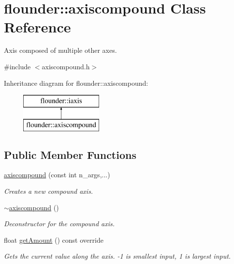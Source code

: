 \hypertarget{classflounder_1_1axiscompound}{}\section{flounder\+:\+:axiscompound Class Reference}
\label{classflounder_1_1axiscompound}


Axis composed of multiple other axes.  




{\ttfamily \#include $<$axiscompound.\+h$>$}

Inheritance diagram for flounder\+:\+:axiscompound\+:\begin{figure}[H]
\begin{center}
\leavevmode
\includegraphics[height=2.000000cm]{classflounder_1_1axiscompound}
\end{center}
\end{figure}
\subsection*{Public Member Functions}
\begin{DoxyCompactItemize}
\item 
\hyperlink{classflounder_1_1axiscompound_a5f1704b50b966bca51730f7fecfc3728}{axiscompound} (const int n\+\_\+args,...)
\begin{DoxyCompactList}\small\item\em Creates a new compound axis. \end{DoxyCompactList}\item 
\hyperlink{classflounder_1_1axiscompound_ae6143bb6a584988c55aaa70545ffae91}{$\sim$axiscompound} ()
\begin{DoxyCompactList}\small\item\em Deconstructor for the compound axis. \end{DoxyCompactList}\item 
float \hyperlink{classflounder_1_1axiscompound_aad0f38f1a532c269cd0e803953861400}{get\+Amount} () const override
\begin{DoxyCompactList}\small\item\em Gets the current value along the axis. -\/1 is smallest input, 1 is largest input. \end{DoxyCompactList}\end{DoxyCompactItemize}

